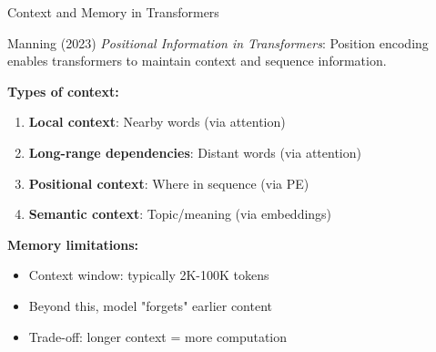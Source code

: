 \documentclass[aspectratio=169]{beamer}
\begin{document}
\begin{frame}[shrink=10]{Context and Memory in Transformers 🧠}
\small
    \begin{block}{Manning (2023)}
        \textit{Positional Information in Transformers}: Position encoding enables transformers to maintain context and sequence information.
    \end{block}

    \vspace{0.3cm}

    \textbf{Types of context:}

    \begin{enumerate}\setlength{\itemsep}{0pt}
        \item \textbf{Local context}: Nearby words (via attention)
        \item \textbf{Long-range dependencies}: Distant words (via attention)
        \item \textbf{Positional context}: Where in sequence (via PE)
        \item \textbf{Semantic context}: Topic/meaning (via embeddings)
    \end{enumerate}

    \vspace{0.3cm}

    \textbf{Memory limitations:}
    \begin{itemize}\setlength{\itemsep}{0pt}
        \item Context window: typically 2K-100K tokens
        \item Beyond this, model "forgets" earlier content
        \item Trade-off: longer context = more computation
    \end{itemize}
\end{frame}
\end{document}
